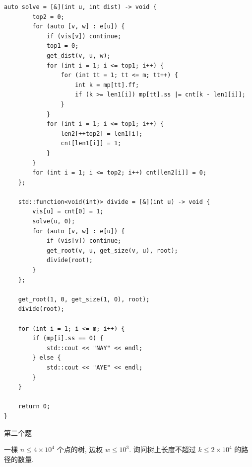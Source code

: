 \documentclass[UTF8, a4paper, titlepage, twoside]{ctexart}
\begin{document}
\begin{lstlisting}[style=cpp]
    auto solve = [&](int u, int dist) -> void {
        top2 = 0;
        for (auto [v, w] : e[u]) {
            if (vis[v]) continue;
            top1 = 0;
            get_dist(v, u, w);
            for (int i = 1; i <= top1; i++) {
                for (int tt = 1; tt <= m; tt++) {
                    int k = mp[tt].ff;
                    if (k >= len1[i]) mp[tt].ss |= cnt[k - len1[i]];
                }
            }
            for (int i = 1; i <= top1; i++) {
                len2[++top2] = len1[i];
                cnt[len1[i]] = 1;
            }
        }
        for (int i = 1; i <= top2; i++) cnt[len2[i]] = 0;
    };

    std::function<void(int)> divide = [&](int u) -> void {
        vis[u] = cnt[0] = 1;
        solve(u, 0);
        for (auto [v, w] : e[u]) {
            if (vis[v]) continue;
            get_root(v, u, get_size(v, u), root);
            divide(root);
        }
    };

    get_root(1, 0, get_size(1, 0), root);
    divide(root);

    for (int i = 1; i <= m; i++) {
        if (mp[i].ss == 0) {
            std::cout << "NAY" << endl;
        } else {
            std::cout << "AYE" << endl;
        }
    }

    return 0;
}
\end{lstlisting}

第二个题

一棵 \(n \leqslant 4 \times 10^4\) 个点的树, 边权 \(w \leqslant 10^3\). 询问树上长度不超过 \(k \leqslant 2 \times 10^4\) 的路径的数量.
\end{document}
